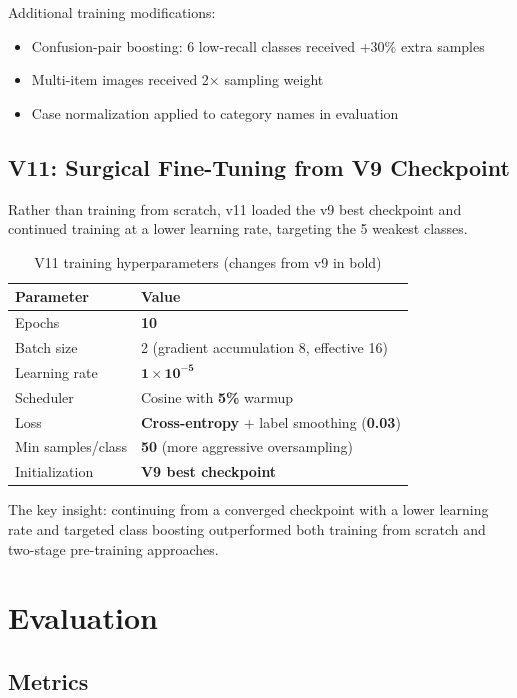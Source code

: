 \documentclass[11pt]{article}
\begin{document}
Additional training modifications:
\begin{itemize}[nosep]
\item Confusion-pair boosting: 6 low-recall classes received +30\% extra samples
\item Multi-item images received 2$\times$ sampling weight
\item Case normalization applied to category names in evaluation
\end{itemize}

\subsection{V11: Surgical Fine-Tuning from V9 Checkpoint}

Rather than training from scratch, v11 loaded the v9 best checkpoint and continued training at a lower learning rate, targeting the 5 weakest classes.

\begin{table}[h]
\centering
\caption{V11 training hyperparameters (changes from v9 in bold)}
\begin{tabular}{ll}
\toprule
Parameter & Value \\
\midrule
Epochs & \textbf{10} \\
Batch size & 2 (gradient accumulation 8, effective 16) \\
Learning rate & $\mathbf{1 \times 10^{-5}}$ \\
Scheduler & Cosine with \textbf{5\%} warmup \\
Loss & \textbf{Cross-entropy} + label smoothing (\textbf{0.03}) \\
Min samples/class & \textbf{50} (more aggressive oversampling) \\
Initialization & \textbf{V9 best checkpoint} \\
\bottomrule
\end{tabular}
\end{table}

The key insight: continuing from a converged checkpoint with a lower learning rate and targeted class boosting outperformed both training from scratch and two-stage pre-training approaches.

\section{Evaluation}

\subsection{Metrics}
\end{document}
